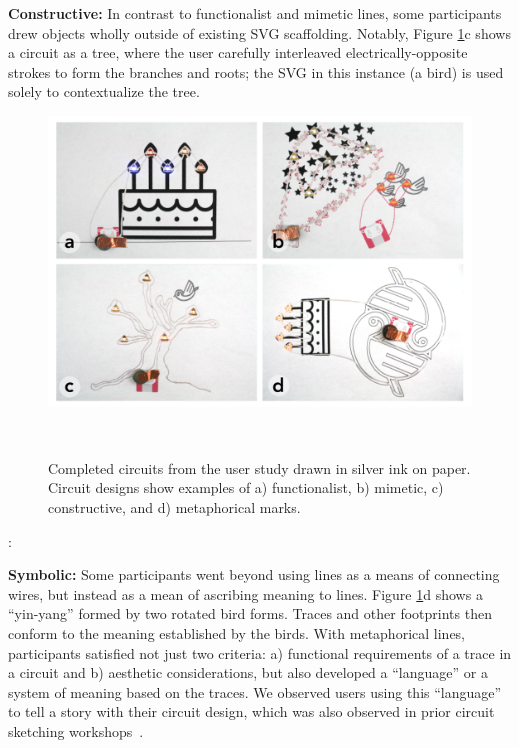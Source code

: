 \documentclass{sigchi}
\begin{document}
  \textbf{Constructive:} In contrast to functionalist and mimetic lines, some participants drew objects wholly outside of existing SVG scaffolding. Notably, Figure \ref{fig:user-artwork}c shows a circuit as a tree, where the user carefully interleaved electrically-opposite strokes to form the branches and roots; the SVG in this instance (a bird) is used solely to contextualize the tree. 
    \begin{figure}[t]
\centering
  \includegraphics[width=1\columnwidth]{figures/users_final_des}
  \caption{Completed circuits from the user study drawn in silver ink on paper. Circuit designs show examples of a) functionalist, b) mimetic, c) constructive, and d) metaphorical marks.}~\label{fig:user-artwork}
  \vspace{-20pt}
\end{figure}

  \begin{myquote}
  \vspace{-2pt}
    :
    \vspace{-2pt}
  \end{myquote}
  
  \textbf{Symbolic:} Some participants went beyond using lines as a means of connecting wires, but instead as a mean of ascribing meaning to lines. Figure \ref{fig:user-artwork}d shows a ``yin-yang'' formed by two rotated bird forms. Traces and other footprints then conform to the meaning established by the birds. With metaphorical lines, participants satisfied not just two criteria: a) functional requirements of a trace in a circuit and b) aesthetic considerations, but also developed a ``language'' or a system of meaning based on the traces. We observed users using this ``language'' to tell a story with their circuit design, which was also observed in prior circuit sketching workshops~\cite{Jacoby:2013cq}.
\end{document}
